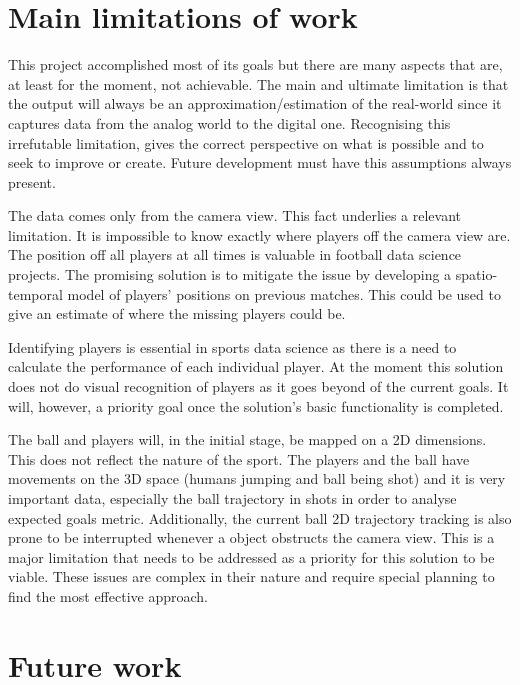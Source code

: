 \documentclass[
11pt,
twoside
]{report}
\begin{document}
\section{Main limitations of work}


This project accomplished most of its goals but there are many aspects that are, at least for the moment, not achievable. The main and ultimate limitation is that the output will always be an approximation/estimation of the real-world since it captures data from the analog world to the digital one. Recognising this irrefutable limitation, gives the correct perspective on what is possible and to seek to improve or create. Future development must have this assumptions always present.


The data comes only from the camera view. This fact underlies a relevant limitation. It is impossible to know exactly where players off the camera view are. The position off all players at all times is valuable in football data science projects. The promising solution is to mitigate the issue by developing a spatio-temporal model of players' positions on previous matches. This could be used to give an estimate of where the missing players could be.


Identifying players is essential in sports data science as there is a need to calculate the performance of each individual player. At the moment this solution does not do visual recognition of players as it goes beyond of the current goals. It will, however, a priority goal once the solution's basic functionality is completed.


The ball and players will, in the initial stage, be mapped on a 2D dimensions. This does not reflect the nature of the sport. The players and the ball have movements on the 3D space (humans jumping and ball being shot) and it is very important data, especially the ball trajectory in shots in order to analyse expected goals metric. Additionally, the current ball 2D trajectory tracking is also prone to be interrupted whenever a object obstructs the camera view. This is a major limitation that needs to be addressed as a priority for this solution to be viable. These issues are complex in their nature and require special planning to find the most effective approach.




\section{Future work}
\end{document}
